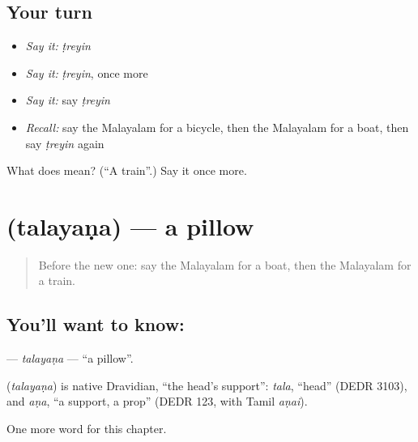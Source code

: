 \subsection*{Your turn}
\begin{itemize}
\raggedright
  \item \emph{Say it:} \emph{ṭreyin}
  \item \emph{Say it:} \emph{ṭreyin}, once more
  \item \emph{Say it:} say \emph{ṭreyin}
  \item \emph{Recall:} say the Malayalam for a bicycle, then the Malayalam for a boat, then say \emph{ṭreyin} again
\end{itemize}

\begin{tcolorbox}[breakable,colback=teal!4,colframe=teal!35!black,title={Before you move on}]
What does  mean? (\textquotedblleft{}A train\textquotedblright{}.) Say it once more.
\end{tcolorbox}
\section[\texorpdfstring{\ml{തലയണ} (talayaṇa)}{തലയണ (talayaṇa)}]{ (talayaṇa) — a pillow}

\label{lesson:ML-C158-talayana}



\begin{quote}
Before the new one: say the Malayalam for a boat, then the Malayalam for a train.
\end{quote}

\subsection*{You'll want to know: }
\textbf{} — \emph{talayaṇa} — \textquotedblleft{}a pillow\textquotedblright{}.

\begin{cousinweb}
\textbf{} (\emph{talayaṇa}) is native Dravidian, \textquotedblleft{}the head's support\textquotedblright{}: \emph{tala}, \textquotedblleft{}head\textquotedblright{} (DEDR 3103), and \emph{aṇa}, \textquotedblleft{}a support, a prop\textquotedblright{} (DEDR 123, with Tamil \emph{aṇai}).
\end{cousinweb}

\begin{grammarlens}[title={What you've built}]
One more word for this chapter.
\end{grammarlens}


